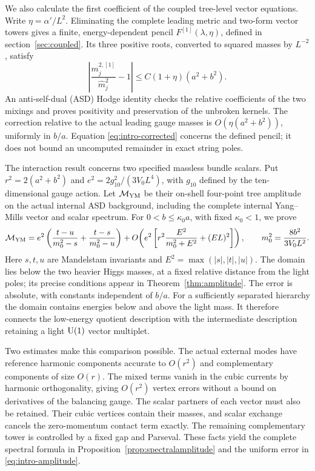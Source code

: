We also calculate the first coefficient of the coupled tree-level vector
equations. Write $\eta=\alpha'/L^2$. Eliminating the complete leading
metric and two-form vector towers gives a finite, energy-dependent pencil
$F^{[1]}(\lambda,\eta)$, defined in section~\ref{sec:coupled}.
Its three positive roots, converted to squared masses by $L^{-2}$,
satisfy
\begin{equation}\label{eq:intro-corrected}
 \left|\frac{m_j^{2,[1]}}{\widehat m_j^2}-1\right|
 \le C(1+\eta)(a^2+b^2).
\end{equation}
An anti-self-dual (ASD) Hodge identity checks the relative coefficients of the two
mixings and proves positivity and preservation of the unbroken kernels.
The correction relative to the actual leading gauge masses is
$O(\eta(a^2+b^2))$, uniformly in $b/a$. Equation
\eqref{eq:intro-corrected} concerns the defined pencil; it does not
bound an uncomputed remainder in exact string poles.

The interaction result concerns two specified massless bundle scalars.
Put $r^2=2(a^2+b^2)$ and $e^2=2g_{10}^2/(3V_0L^4)$, with $g_{10}$
defined by the ten-dimensional gauge action. Let $\mathcal M_{\rm YM}$
be their on-shell four-point tree amplitude on the actual internal ASD
background, including the complete internal Yang--Mills vector and scalar
spectrum. For $0<b\le\kappa_0a$, with fixed $\kappa_0<1$, we prove
\begin{equation}\label{eq:intro-amplitude}
 \mathcal M_{\rm YM}
 =e^2\left(\frac{t-u}{m_0^2-s}+\frac{t-s}{m_0^2-u}\right)
 +O\!\left(e^2\left[r^2\frac{E^2}{m_0^2+E^2}+(EL)^2\right]\right),
 \qquad m_0^2=\frac{8b^2}{3V_0L^2}.
\end{equation}
Here $s,t,u$ are Mandelstam invariants and
$E^2=\max(|s|,|t|,|u|)$. The domain lies below the two heavier Higgs
masses, at a fixed relative distance from the light poles; its precise
conditions appear in Theorem~\ref{thm:amplitude}. The error is absolute,
with constants independent of $b/a$. For a sufficiently separated
hierarchy the domain contains energies below and above the light mass.
It therefore connects the low-energy quotient description with the
intermediate description retaining a light $\operatorname{U}(1)$ vector multiplet.

Two estimates make this comparison possible. The actual external modes
have reference harmonic components accurate to $O(r^2)$ and complementary
components of size $O(r)$. The mixed terms vanish in the cubic currents
by harmonic orthogonality, giving $O(r^2)$ vertex errors without a bound
on derivatives of the balancing gauge. The scalar partners of each vector
must also be retained. Their cubic vertices contain their masses, and
scalar exchange cancels the zero-momentum contact term exactly. The
remaining complementary tower is controlled by a fixed gap and Parseval.
These facts yield the complete spectral formula in
Proposition~\ref{prop:spectralamplitude} and the uniform error in
\eqref{eq:intro-amplitude}.

